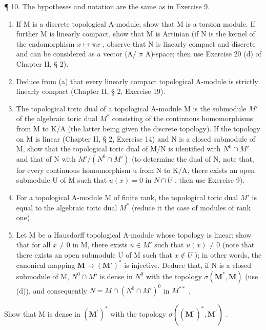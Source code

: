 ¶ 10. The hypotheses and notation are the same as in Exercise 9.

\begin{enumerate}
\def\labelenumi{(\alph{enumi})}
\item
  If M is a discrete topological A-module, show that M is a torsion module. If further M is linearly compact, show that M is Artinian (if N is the kernel of the endomorphism \(x \mapsto \pi x\) , observe that N is linearly compact and discrete and can be considered as a vector (A/ \(\pi\) A)-space; then use Exercise 20 (d) of Chapter II, § 2).
\item
  Deduce from (a) that every linearly compact topological A-module is strictly linearly compact (Chapter II, § 2, Exercise 19).
\item
  The topological toric dual of a topological A-module M is the submodule \(M'\) of the algebraic toric dual \(M^{*}\) consisting of the continuous homomorphisms from M to K/A (the latter being given the discrete topology). If the topology on M is linear (Chapter II, § 2, Exercise 14) and N is a closed submodule of M, show that the topological toric dual of M/N is identified with \(N^{0} \cap M'\) and that of N with \(M' / (N^{0} \cap M')\) (to determine the dual of N, note that, for every continuous homomorphism u from N to K/A, there exists an open submodule U of M such that \(u(x) = 0\) in \(N \cap U\) , then use Exercise 9).
\item
  For a topological A-module M of finite rank, the topological toric dual \(M'\) is equal to the algebraic toric dual \(M^{*}\) (reduce it the case of modules of rank one).
\item
  Let M be a Hausdorff topological A-module whose topology is linear; show that for all \(x \neq 0\) in M, there exists \(u \in M'\) such that \(u(x) \neq 0\) (note that there exists an open submodule U of M such that \(x \notin U\) ); in other words, the canonical mapping \(\mathbf{M} \to (\mathbf{M}')^*\) is injective. Deduce that, if N is a closed submodule of M, \(N^0 \cap M'\) is dense in \(N^0\) with the topology \(\sigma(\mathbf{M}^*, \mathbf{M})\) (use (d)), and consequently \(N = M \cap (N^0 \cap M')^0\) in \(M^{**}\) .
\end{enumerate}

Show that M is dense in \((\mathbf{M}^{\prime})^{*}\) with the topology \(\sigma((\mathbf{M}^{\prime})^{*}, \mathbf{M}^{\prime})\) .

